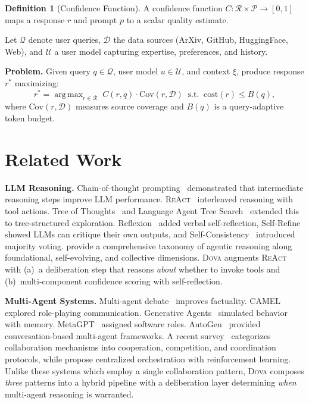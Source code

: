 \documentclass{article}
\theoremstyle{plain}
\theoremstyle{definition}
\newtheorem{definition}[theorem]{Definition}
\newcommand{\dova}{\textsc{Dova}}
\newcommand{\react}{\textsc{ReAct}}
\DeclareMathOperator*{\argmax}{arg\,max}
\begin{document}
\begin{definition}[Confidence Function]
A confidence function $C\!: \mathcal{R} \times \mathcal{P} \to [0, 1]$ maps a
response $r$ and prompt $p$ to a scalar quality estimate.
\end{definition}

Let $\mathcal{Q}$ denote user queries, $\mathcal{D}$ the data sources
(ArXiv, GitHub, HuggingFace, Web), and $\mathcal{U}$ a user model capturing
expertise, preferences, and history.

\textbf{Problem.}
Given query $q \in \mathcal{Q}$, user model $u \in \mathcal{U}$, and context
$\xi$, produce response $r^*$ maximizing:
\begin{equation}\label{eq:objective}
  r^* = \argmax_{r \in \mathcal{R}} \; C(r, q) \cdot \mathrm{Cov}(r, \mathcal{D})
  \;\; \text{s.t.} \;\;
  \mathrm{cost}(r) \leq B(q),
\end{equation}
where $\mathrm{Cov}(r, \mathcal{D})$ measures source coverage and $B(q)$ is a
query-adaptive token budget.

\section{Related Work}\label{sec:related}

\textbf{LLM Reasoning.}\quad
Chain-of-thought prompting~\citep{wei2022chain} demonstrated that intermediate
reasoning steps improve LLM performance.
\react{}~\citep{yao2023react} interleaved reasoning with tool actions.
Tree of Thoughts~\citep{yao2023tree} and Language Agent Tree
Search~\citep{zhou2023lats} extended this to tree-structured exploration.
Reflexion~\citep{shinn2023reflexion} added verbal self-reflection,
Self-Refine~\citep{madaan2023selfrefine} showed LLMs can critique their own
outputs, and Self-Consistency~\citep{wang2023selfconsistency} introduced
majority voting.  \citet{wei2026agentic} provide a comprehensive taxonomy of agentic reasoning
along foundational, self-evolving, and collective dimensions.
\dova{} augments \react{} with (a)~a deliberation step
that reasons \emph{about} whether to invoke tools and (b)~multi-component
confidence scoring with self-reflection.

\textbf{Multi-Agent Systems.}\quad
Multi-agent debate~\citep{du2023debate,liang2023debate} improves factuality.
CAMEL~\citep{li2023camel} explored role-playing communication.
Generative Agents~\citep{park2023generative} simulated behavior with memory.
MetaGPT~\citep{hong2023metagpt} assigned software roles.
AutoGen~\citep{wu2023autogen} provided conversation-based multi-agent
frameworks.  A recent survey~\citep{tran2025multiagent} categorizes collaboration mechanisms
into cooperation, competition, and coordination protocols, while
\citet{dang2025evolving} propose centralized orchestration with reinforcement
learning.
Unlike these systems which employ a single collaboration pattern,
\dova{} composes \emph{three} patterns into a hybrid pipeline with a
deliberation layer determining \emph{when} multi-agent reasoning is warranted.
\end{document}
